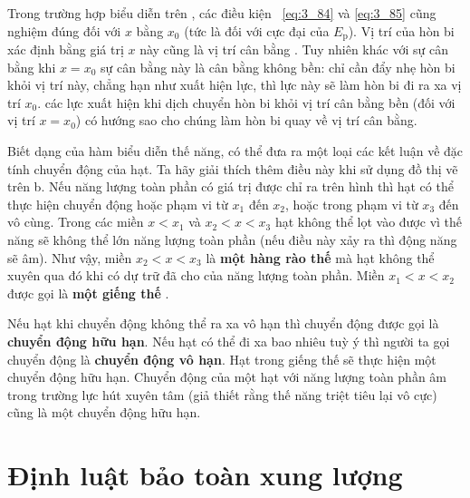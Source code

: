 \begin{figure}[!htb]
\begin{minipage}[t]{0.5\linewidth}
\begin{center}
			\caption[]{}
			\label{fig:3_15}
		\end{center}
	\end{minipage}
\end{figure}

Trong trường hợp biểu diễn trên , các điều kiện ~\eqref{eq:3_84} và \eqref{eq:3_85} cũng nghiệm đúng đối với $x$ bằng $x_0$ (tức là đối với cực đại của $E_{\text{p}}$). Vị trí của hòn bi xác định bằng giá trị $x$ này cũng là vị trí cân bằng . Tuy nhiên khác với sự cân bằng khi $x=x_0$ sự cân bằng này là cân bằng không bền: chỉ cần đẩy nhẹ hòn bi khỏi vị trí này, chẳng hạn như xuất hiện lực, thì lực này sẽ làm hòn bi đi ra xa vị trí $x_0$. các lực xuất hiện khi dịch chuyển hòn bi khỏi vị trí cân bằng bền (đối với vị trí $x=x_0$) có hướng sao cho chúng làm hòn bi quay về vị trí cân bằng.

Biết dạng của hàm biểu diễn thế năng, có thể đưa ra một loại các kết luận về đặc tính chuyển động của hạt. Ta hãy giải thích thêm điều này khi sử dụng đồ thị vẽ trên b. Nếu năng lượng toàn phần có giá trị được chỉ ra trên hình thì hạt có thể thực hiện chuyển động hoặc phạm vi từ $x_1$ đến  $x_2$, hoặc trong phạm vi từ  $x_3$ đến vô cùng. Trong các miền $x<x_1$ và $x_2<x<x_3$ hạt không thể lọt vào được vì thế năng sẽ không thể lớn năng lượng toàn phần (nếu điều này xảy ra thì động năng sẽ âm). Như vậy, miền $x_2<x<x_3$ là   \textbf{một hàng rào thế} mà hạt không thể xuyên qua đó khi có dự trữ đã cho của năng lượng toàn phần. Miền $x_1<x<x_2$ được gọi là  \textbf{một giếng thế }.

Nếu hạt khi chuyển động không thể ra xa vô hạn thì chuyển động được gọi là \textbf{chuyển động hữu hạn}. Nếu hạt có thể đi xa bao nhiêu tuỳ ý thì người ta gọi chuyển động là \textbf{chuyển động vô hạn}. Hạt trong giếng thế sẽ thực hiện một chuyển động hữu hạn. Chuyển động của một hạt với năng lượng toàn phần âm trong trường lực hút xuyên tâm (giả thiết rằng thế năng triệt tiêu lại vô cực) cũng là một chuyển động hữu hạn.  


\section{Định luật bảo toàn xung lượng}\label{sec:3_10}

